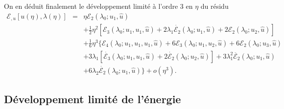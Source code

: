 \documentclass[12pt, final]{amsart}
\begin{document}
On en déduit finalement le développement limité {\`a} l'ordre 3 en
$\eta$ du résidu
\begin{eqnarray}
  \mathcal{E}_{, u} [u (\eta), \lambda (\eta)] & = & \eta \mathcal{E}_2
  (\lambda_0 ; u_1, \hat{u}) \nonumber\\
  &  &  + \tfrac{1}{2} \eta^2  [\mathcal{E}_3 (\lambda_0 ; u_1, u_1,
  \hat{u}) + 2 \lambda_1  \dot{\mathcal{E}_2} (\lambda_0 ; u_1, \hat{u}) +
  2\mathcal{E}_2 (\lambda_0 ; u_2, \hat{u})] \nonumber\\
  &  &  + \tfrac{1}{6} \eta^3  \{ \mathcal{E}_4 (\lambda_0 ; u_1,
  u_1, u_1, \hat{u}) + 6\mathcal{E}_3 (\lambda_0 ; u_1, u_2, \hat{u})
   + 6\mathcal{E}_2 (\lambda_0 ; u_3, \hat{u}) \nonumber\\
  &  &  + 3 \lambda_1  [\dot{\mathcal{E}_3} (\lambda_0 ; u_1, u_1,
  \hat{u}) + 2 \dot{\mathcal{E}_2} (\lambda_0 ; u_2, \hat{u})] + 3 \lambda_1^2
  \ddot{\mathcal{E}_2} (\lambda_0 ; u_1, \hat{u}) \nonumber\\
  &  &   + 6 \lambda_2  \dot{\mathcal{E}_2} (\lambda_0 ;
  u_1, \hat{u}) \} + o (\eta^3) .  \label{eq20220107080901}
\end{eqnarray}
\subsection{Développement limité de
l'énergie}\label{sec20220121172919}
\end{document}
